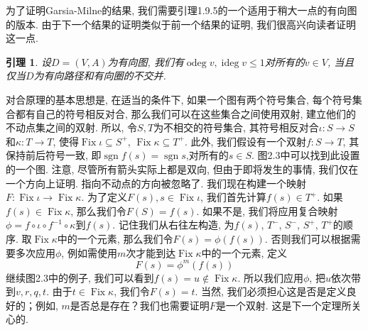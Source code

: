 \documentclass{ctexbook}
\newtheorem{lem}[thm]{引理}
\begin{document}
	为了证明Garsia-Milne的结果, 我们需要引理1.9.5的一个适用于稍大一点的有向图的版本. 由于下一个结果的证明类似于前一个结果的证明, 我们很高兴向读者证明这一点.
\begin{lem}
	设$D=(V,A)$为有向图, 我们有$\operatorname{odeg}v,\operatorname{ideg}v\leq1$对所有的$v\in V$, 当且仅当$D$为有向路径和有向圈的不交并.
\end{lem}

	对合原理的基本思想是, 在适当的条件下, 如果一个图有两个符号集合, 每个符号集合都有自己的符号相反对合, 那么我们可以在这些集合之间使用双射, 建立他们的不动点集之间的双射. 所以, 令$S,T$为不相交的符号集合, 其符号相反对合$\iota:S\rightarrow S$和$\kappa:T\rightarrow T$, 使得$\operatorname{Fix}\iota \subseteq S^{+}$, $\operatorname{Fix}\kappa \subseteq T^{+}$. 此外, 我们假设有一个双射$f:S\rightarrow T$, 其保持前后符号一致, 即$\operatorname{sgn}f(s)=\operatorname{sgn}s$,对所有的$s\in S$. 图2.3中可以找到此设置的一个图. 注意, 尽管所有箭头实际上都是双向, 但由于即将发生的事情, 我们仅在一个方向上证明. 指向不动点的方向被忽略了. 我们现在构建一个映射$F:\operatorname{Fix}\iota \rightarrow \operatorname{Fix}\kappa$. 为了定义$F(s),s\in \operatorname{Fix}\iota$, 我们首先计算$f(s)\in T^{+}$. 如果$f(s)\in \operatorname{Fix}\kappa$, 那么我们令$F(S)=f(s)$. 如果不是, 我们将应用复合映射$\phi=f\circ \iota \circ f^{-1} \circ \kappa$到$f(s)$. 记住我们从右往左构造, 为$f(s)$, $T^{-}$, $S^{-}$, $S^{+}$, $T^{+}$的顺序. 取$\operatorname{Fix}\kappa$中的一个元素, 那么我们令$F(s)=\phi(f(s))$. 否则我们可以根据需要多次应用$\phi$, 例如需使用$m$次才能到达$\operatorname{Fix}\kappa$中的一个元素, 定义
\begin{equation}
F(s)=\phi^{m}(f(s))
\end{equation}
	继续图2.3中的例子, 我们可以看到$f(s)=u\notin \operatorname{Fix}\kappa$. 所以我们应用$\phi$, 把$u$依次带到$v,r,q,t$. 由于$t\in \operatorname{Fix}\kappa$, 我们令$F(s)=t$. 当然, 我们必须担心这是否是定义良好的；例如, $m$是否总是存在？我们也需要证明$F$是一个双射. 这是下一个定理所关心的.
\end{document}
